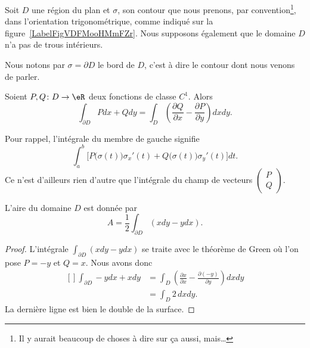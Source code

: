 Soit $D$ une région du plan et $\sigma$, son contour que nous prenons, par convention\footnote{Il y aurait beaucoup de choses à dire sur ça aussi, mais\ldots}, dans l'orientation trigonométrique, comme indiqué sur la figure~\ref{LabelFigVDFMooHMmFZr}. Nous supposons également que le domaine $D$ n'a pas de trous intérieurs.
\newcommand{\CaptionFigVDFMooHMmFZr}{Un contour avec son ortientation.}


Nous notons par $\sigma=\partial D$ le bord de $D$, c'est à dire le contour dont nous venons de parler.

\begin{theorem}
    Soient $P,Q\colon D\to \eR$ deux fonctions de classe $C^1$. Alors
    \begin{equation}        \label{EqThoGreen}
        \int_{\partial D} Pdx+Qdy=\int_D\left( \frac{ \partial Q }{ \partial x }-\frac{ \partial P }{ \partial y } \right)dxdy.
    \end{equation}
\end{theorem}
Pour rappel, l'intégrale du membre de gauche signifie
\begin{equation}
    \int_a^b \Big[P\big( \sigma(t) \big)\sigma_x'(t)+Q\big( \sigma(t) \big)\sigma_y'(t)\Big]dt.
\end{equation}
Ce n'est d'ailleurs rien d'autre que l'intégrale du champ de vecteurs $\begin{pmatrix}
    P    \\
    Q
\end{pmatrix}$.

\begin{corollary}
    L'aire du domaine $D$ est donnée par
    \begin{equation}
        A=\frac{ 1 }{2}\int_{\partial D}(xdy-ydx).
    \end{equation}
\end{corollary}

\begin{proof}
    L'intégrale $\int_{\partial D}(xdy-ydx)$ se traite avec le théorème de Green où l'on pose $P=-y$ et $Q=x$. Nous avons donc
    \begin{equation}
        \begin{aligned}[]
            \int_{\partial D} -ydx+xdy&=\int_D\left( \frac{ \partial x }{ \partial x }-\frac{ \partial (-y) }{ \partial y } \right)dxdy\\
            &=\int_D2\,dxdy.
        \end{aligned}
    \end{equation}
    La dernière ligne est bien le double de la surface.
\end{proof}

